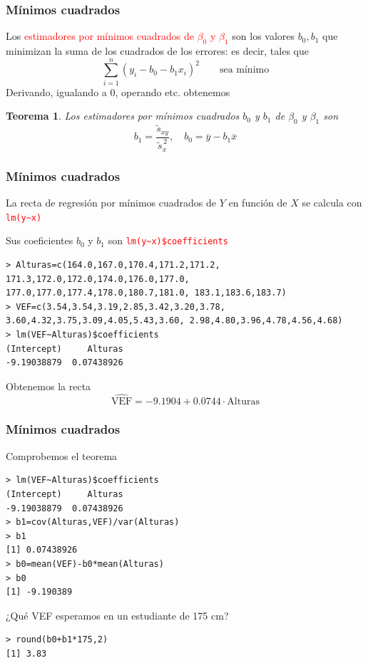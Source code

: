 \documentclass[12pt,t]{beamer}
\newcommand{\red}[1]{\textcolor{red}{#1}}
\theoremstyle{plain}
\newtheorem{teorema}{Teorema}
\theoremstyle{definition}
\begin{document}
\begin{frame}
\frametitle{Mínimos cuadrados}


Los \red{estimadores por mínimos cuadrados de $\beta_0$ y $\beta_1$} son los valores $b_0,b_1$ que minimizan la suma de los cuadrados de los errores: es decir, tales que
$$
\sum_{i=1}^n (y_i-b_0-b_1 x_i)^2\qquad \mbox{sea mínimo}
$$
Derivando, igualando a 0, operando etc. obtenemos

\begin{teorema}
Los estimadores por mínimos cuadrados $b_0$ y $b_1$ de $\beta_0$ y $\beta_1$ son
$$
b_1 =\frac{\widetilde{s}_{xy}}{\widetilde{s}^{\, 2}_x},\quad b_0 = \overline{y}-b_1 \overline{x}
$$
\end{teorema}

\end{frame}

\begin{frame}[fragile]
\frametitle{Mínimos cuadrados}

La recta de regresión por mínimos cuadrados de $Y$ en función de $X$ se calcula con \red{\tt lm(y\~{}x)}\medskip

Sus coeficientes $b_0$ y $b_1$ son \red{\tt lm(y\~{}x)\$coefficients}\medskip

\begin{lstlisting}
> Alturas=c(164.0,167.0,170.4,171.2,171.2, 171.3,172.0,172.0,174.0,176.0,177.0, 177.0,177.0,177.4,178.0,180.7,181.0, 183.1,183.6,183.7)
> VEF=c(3.54,3.54,3.19,2.85,3.42,3.20,3.78, 3.60,4.32,3.75,3.09,4.05,5.43,3.60, 2.98,4.80,3.96,4.78,4.56,4.68)
> lm(VEF~Alturas)$coefficients
(Intercept)     Alturas 
-9.19038879  0.07438926 
\end{lstlisting}
Obtenemos la recta
$$
\widehat{\mbox{VEF}}=-9.1904+  0.0744\cdot \mbox{Alturas}
$$
\end{frame}

\begin{frame}[fragile]
\frametitle{Mínimos cuadrados}
Comprobemos el teorema\medskip

\begin{lstlisting}
> lm(VEF~Alturas)$coefficients
(Intercept)     Alturas 
-9.19038879  0.07438926 
> b1=cov(Alturas,VEF)/var(Alturas)
> b1
[1] 0.07438926
> b0=mean(VEF)-b0*mean(Alturas)
> b0
[1] -9.190389
\end{lstlisting}\medskip

¿Qué VEF esperamos en un estudiante de 175 cm?
\begin{lstlisting}
> round(b0+b1*175,2)
[1] 3.83
\end{lstlisting}


\end{frame}
\end{document}
